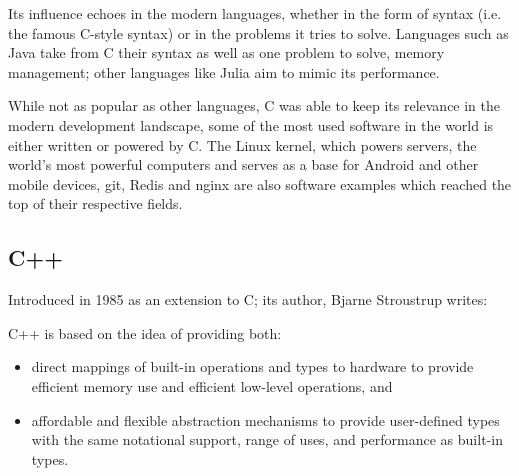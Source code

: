 Its influence echoes in the modern languages,
whether in the form of syntax (i.e. the famous C-style syntax) or in the problems it tries to solve.
Languages such as Java take from C their syntax as well as one problem to solve, memory management;
other languages like Julia \autocite{Bezanson2017} aim to mimic its performance.

While not as popular as other languages, C was able to keep its relevance in the modern development landscape,
some of the most used software in the world is either written or powered by C.
The Linux kernel, which powers servers, the world's most powerful computers
and serves as a base for Android and other mobile devices,
git, Redis and nginx are also software examples which reached the top of their respective fields.



\subsection{C++}

Introduced in 1985 as an extension to C; its author, Bjarne Stroustrup writes:

\begin{displayquote}
    C++  is  based  on  the idea of providing both:
    \begin{itemize}
        \item direct mappings of built-in operations and types to hardware to provide efficient memory use and efficient low-level operations, and
        \item affordable and flexible abstraction mechanisms to provide user-defined types with the same notational support, range of uses, and performance as built-in types.
    \end{itemize}
\end{displayquote}


